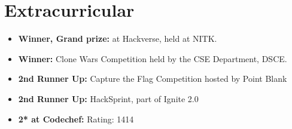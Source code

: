 \documentclass[letterpaper,11pt]{article}
\begin{document}
\section{Extracurricular} \vspace{0.5pt}
\begin{itemize}[leftmargin=0.15in, label={}, itemsep=0.08em, topsep=1pt]
    \item \textbf{Winner, Grand prize:} at Hackverse, held at NITK.
    \item \textbf{Winner:} Clone Wars Competition held by the CSE Department, DSCE.
    \item \textbf{2nd Runner Up:} Capture the Flag Competition hosted by Point Blank 
    \item \textbf{2nd Runner Up:} HackSprint, part of Ignite 2.0
    \item \textbf{2* at Codechef:} Rating: 1414
\end{itemize}
\end{document}
